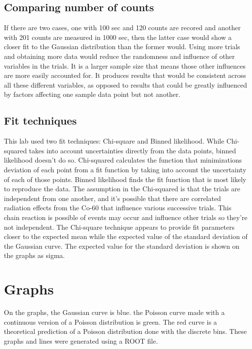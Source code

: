 \documentclass[10pt]{article}
\begin{document}
 \subsection{Comparing number of counts}
 
If there are two cases, one with 100 sec and 120 counts are recored and another with 201 counts are measured in 1000 sec, then the latter case would show a closer fit to the Gaussian distribution than the former would. Using more trials and obtaining more data would reduce the randomness and influence of other variables in the trials. It is a larger sample size that means those other influences are more easily accounted for. It produces results that would be consistent across all these different variables, as opposed to results that could be greatly influenced by factors affecting one sample data point but not another. 

 \subsection{Fit techniques}

 This lab used two fit techniques: Chi-square and Binned likelihood. While Chi-squared takes into account uncertainties directly from the data points, binned likelihood doesn't do so. Chi-squared calculates the function that minimizations deviation of each point from a fit function by taking into account the uncertainty of each of those points. Binned likelihood finds the fit function that is most likely to reproduce the data. The assumption in the Chi-squared is that the trials are independent from one another, and it's possible that there are correlated radiation effects from the Co-60 that influence various successive trials. This chain reaction is possible of events may occur and influence other trials so they're not independent. The Chi-square technique appears to provide fit parameters closer to the expected mean while the expected value of the standard deviation of the Gaussian curve. The expected value for the standard deviation is shown on the graphs as sigma.

\section{Graphs}

On the graphs, the Gaussian curve is blue. the Poisson curve made with a continuous version of a Poisson distribution is green. The red curve is a theoretical prediction of a Poisson distribution done with the discrete bins. These graphs and lines were generated using a ROOT file. 
\end{document}
